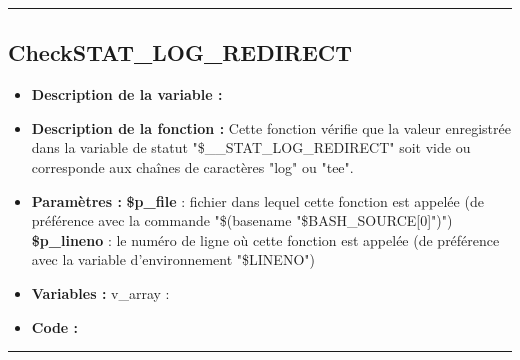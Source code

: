 \documentclass[a4paper,10pt]{article}
\begin{document}
\color{green}\par\noindent\rule{\textwidth}{0.4pt}\color{white}

\color{green}
\subsection{CheckSTAT\_LOG\_REDIRECT}\color{white}
\begin{itemize}
    \item \textbf{Description de la variable :}

    \item \textbf{Description de la fonction :} Cette fonction vérifie que la valeur enregistrée dans la variable de statut "\$\_\_STAT\_LOG\_REDIRECT" soit vide ou corresponde aux chaînes de caractères "log" ou "tee".

    \item \textbf{Paramètres :}
        \color{orange}\textbf{\$p\_file}\color{white} : fichier dans lequel cette fonction est appelée (de préférence avec la commande "\$(\color{gray}basename \color{white}"\color{orange}\$BASH\_SOURCE[0]\color{white}")")
    \color{orange}\textbf{\$p\_lineno}\color{white} : le numéro de ligne où cette fonction est appelée (de préférence avec la variable d'environnement "\color{orange}\$LINENO\color{white}")

    \item \textbf{Variables :} v\_array :

    \item \textbf{Code :}
\end{itemize}



\color{green}\par\noindent\rule{\textwidth}{0.4pt}\color{white}

\color{green}
\end{document}
